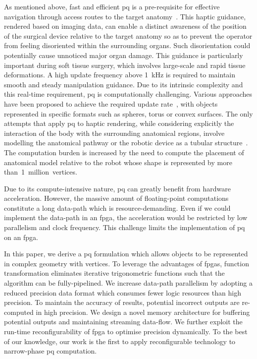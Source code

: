 As mentioned above, fast and efficient \gls{pq} is a pre-requisite for effective navigation through access routes to the target anatomy~\cite{kwok10}.
This haptic guidance, rendered based on imaging data, can enable a distinct awareness of the position of the surgical device relative to the target anatomy so as to prevent the operator from feeling disoriented within the surrounding organs. 
Such disorientation could potentially cause unnoticed major organ damage. 
This guidance is particularly important during soft tissue surgery, which involves large-scale and rapid tissue deformations. 
A high update frequency above 1~kHz is required to maintain smooth and steady manipulation guidance. 
Due to its intrinsic complexity and this real-time requirement, \gls{pq} is computationally challenging.
Various approaches have been proposed to achieve the required update rate~\cite{benallegue09,chakraborty08}, 
with objects represented in specific formats such as spheres, torus or convex surfaces.
The only attempts that apply \gls{pq} to haptic rendering, while considering explicitly the interaction of the body with the surrounding anatomical regions, involve modelling the anatomical pathway or the robotic device as a tubular structure~\cite{li07,kwok13}.
The computation burden is increased by the need to compute the placement of anatomical model relative to the robot whose shape is represented by more than~1~million~vertices.

Due to its compute-intensive nature, \gls{pq} can greatly benefit from hardware acceleration.
However, the massive amount of floating-point computations constitute a long data-path which is resource-demanding.
Even if we could implement the data-path in an \gls{fpga}, the acceleration would be restricted by low parallelism and clock frequency.
This challenge limits the implementation of \gls{pq} on an \gls{fpga}.

In this paper, we derive a \gls{pq} formulation which allows objects to be represented in complex geometry with vertices.
To leverage the advantages of \gls{fpga}s, function transformation eliminates iterative trigonometric functions such that the algorithm can be fully-pipelined.
We increase data-path parallelism by adopting a reduced precision data format which consumes fewer logic resources than high precision.
To maintain the accuracy of results, potential incorrect outputs are re-computed in high precision.
We design a novel memory architecture for buffering potential outputs and maintaining streaming data-flow.
We further exploit the run-time reconfigurability of \gls{fpga} to optimise precision dynamically.
To the best of our knowledge, our work is the first to apply reconfigurable technology to narrow-phase \gls{pq} computation.

